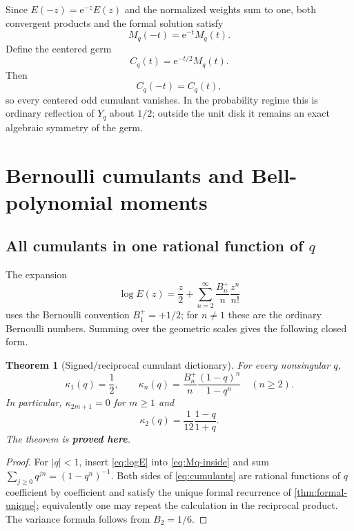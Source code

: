 \documentclass[11pt,oneside]{article}
\numberwithin{equation}{section}
\newtheorem{theorem}{Theorem}[section]
\theoremstyle{definition}
\theoremstyle{remark}
\newcommand{\e}{\mathrm e}
\newcommand{\proved}{\textcolor{deepgreen}{\textbf{proved here}}}
\begin{document}
Since $E(-z)=\e^{-z}E(z)$ and the normalized weights sum to one, both convergent
products and the formal solution satisfy
\begin{equation}
 M_q(-t)=\e^{-t}M_q(t).
 \label{eq:M-reflection}
\end{equation}
Define the centered germ
\begin{equation}
 C_q(t)=\e^{-t/2}M_q(t).
 \label{eq:Cq}
\end{equation}
Then
\begin{equation}
 C_q(-t)=C_q(t),
 \label{eq:C-even}
\end{equation}
so every centered odd cumulant vanishes.  In the probability regime this is
ordinary reflection of $Y_q$ about $1/2$; outside the unit disk it remains an
exact algebraic symmetry of the germ.

\section{Bernoulli cumulants and Bell-polynomial moments}
\label{sec:cumulants}

\subsection[All cumulants in one rational function of q]{All cumulants in one rational function of $q$}

The expansion
\begin{equation}
 \log E(z)=\frac z2+
 \sum_{n=2}^{\infty}\frac{B_n^+}{n}\frac{z^n}{n!}
 \label{eq:logE}
\end{equation}
uses the Bernoulli convention $B_1^+=+1/2$; for $n\ne1$ these are the ordinary
Bernoulli numbers.  Summing over the geometric scales gives the following
closed form.

\begin{theorem}[Signed/reciprocal cumulant dictionary]
\label{thm:cumulants}
For every nonsingular $q$,
\begin{equation}
 \boxed{
 \kappa_1(q)=\frac12,
 \qquad
 \kappa_n(q)=\frac{B_n^+}{n}\frac{(1-q)^n}{1-q^n}
 \quad(n\ge2).}
 \label{eq:cumulants}
\end{equation}
In particular, $\kappa_{2m+1}=0$ for $m\ge1$ and
\begin{equation}
 \kappa_2(q)=\frac1{12}\frac{1-q}{1+q}.
 \label{eq:variance}
\end{equation}
The theorem is \proved.
\end{theorem}

\begin{proof}
For $|q|<1$, insert \eqref{eq:logE} into \eqref{eq:Mq-inside} and sum
$\sum_{j\ge0}q^{jn}=(1-q^n)^{-1}$.  Both sides of \eqref{eq:cumulants} are
rational functions of $q$ coefficient by coefficient and satisfy the unique
formal recurrence of \cref{thm:formal-unique}; equivalently one may repeat the
calculation in the reciprocal product.  The variance formula follows from
$B_2=1/6$.
\end{proof}
\end{document}
